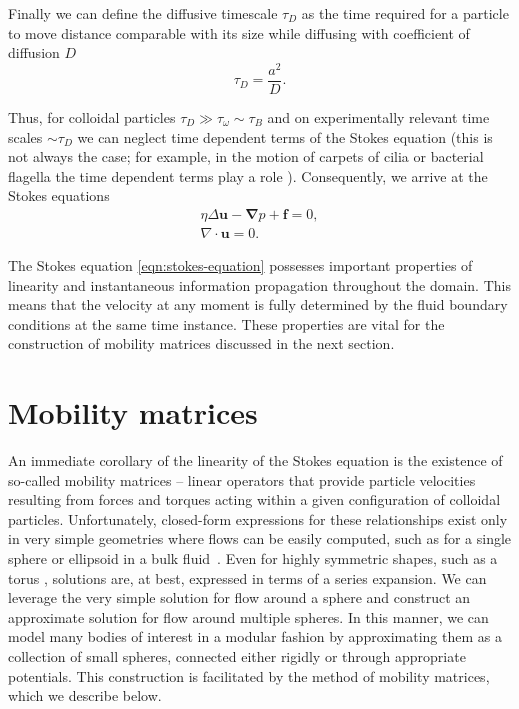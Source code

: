 \documentclass[physics]{doctoral}
\begin{document}
Finally we can define the diffusive timescale $\tau_D$ as the time required for a particle to move distance comparable with its size while diffusing with coefficient of diffusion $D$
\begin{equation}
    \tau_D = \frac{a^2}{D}.
    \label{eqn:diffusive-timescale}
\end{equation}

Thus, for colloidal particles $\tau_D \gg \tau_\omega \sim \tau_B$ and on experimentally relevant time scales $\sim \tau_D$ we can neglect time dependent terms of the Stokes equation (this is not always the case; for example, in the motion of carpets of cilia or bacterial flagella the time dependent terms play a role \cite{Wei_2021}).
Consequently, we arrive at the Stokes equations
\begin{eqnarray}
    \eta \Delta \bm{u} - \bm{\nabla} p + \bm{f} = 0, \label{eqn:stokes-equation} \\
    \nabla \cdot \bm{u} = 0.
\end{eqnarray}

The Stokes equation \eqref{eqn:stokes-equation} possesses important properties of linearity and instantaneous information propagation throughout the domain.
This means that the velocity at any moment is fully determined by the fluid boundary conditions at the same time instance.
These properties are vital for the construction of mobility matrices discussed in the next section.

\section{Mobility matrices}

An immediate corollary of the linearity of the Stokes equation is the existence of so-called mobility matrices -- linear operators that provide particle velocities resulting from forces and torques acting within a given configuration of colloidal particles.
Unfortunately, closed-form expressions for these relationships exist only in very simple geometries where flows can be easily computed, such as for a single sphere or ellipsoid in a bulk fluid~\cite{Kim_2013}.
Even for highly symmetric shapes, such as a torus \cite{Goren_1980, Majumdar_1977}, solutions are, at best, expressed in terms of a series expansion.
We can leverage the very simple solution for flow around a sphere and construct an approximate solution for flow around multiple spheres.
In this manner, we can model many bodies of interest in a modular fashion by approximating them as a collection of small spheres, connected either rigidly or through appropriate potentials.
This construction is facilitated by the method of mobility matrices, which we describe below.
\end{document}
